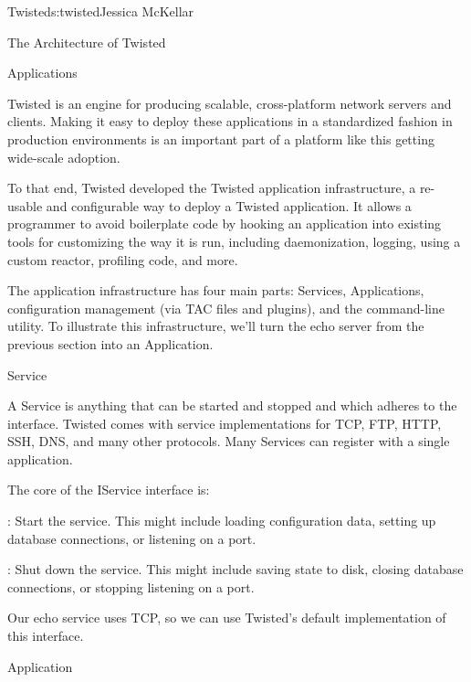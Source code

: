 \begin{aosachapter}{Twisted}{s:twisted}{Jessica McKellar}
\begin{aosasect1}{The Architecture of Twisted}
\begin{aosasect2}{Applications}

Twisted is an engine for producing scalable, cross-platform network servers
and clients. Making it easy to deploy these applications in a standardized
fashion in production environments is an important part of a platform like this
getting wide-scale adoption.

To that end, Twisted developed the Twisted application infrastructure, a
re-usable and configurable way to deploy a Twisted application. It allows a
programmer to avoid boilerplate code by hooking an application into existing
tools for customizing the way it is run, including daemonization, logging, using
a custom reactor, profiling code, and more.

The application infrastructure has four main parts: Services, Applications,
configuration management (via TAC files and plugins), and the 
command-line utility. To illustrate this infrastructure, we'll turn the echo
server from the previous section into an Application.

\begin{aosasect3}{Service}

A Service is anything that can be started and stopped and which adheres to
the  interface. Twisted comes with service implementations
for TCP, FTP, HTTP, SSH, DNS, and many other protocols. Many Services can
register with a single application.

The core of the IService interface is:

\begin{aosaitemize}

\item {}: Start the service. This might include
  loading configuration data, setting up database connections, or
  listening on a port.

\item {}: Shut down the service. This might include
  saving state to disk, closing database connections, or stopping
  listening on a port.

\end{aosaitemize}

Our echo service uses TCP, so we can use Twisted's default
 implementation of this 
interface.

\end{aosasect3}

\begin{aosasect3}{Application}


\end{aosasect3}
\end{aosasect2}
\end{aosasect1}
\end{aosachapter}
